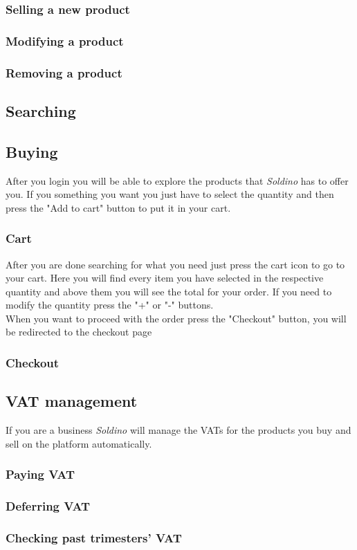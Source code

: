 	\subsubsection{Selling a new product}
	
	\subsubsection{Modifying a product}
	
	\subsubsection{Removing a product}
	
	\subsection{Searching}
	\subsection{Buying}
	After you login you will be able to explore the products that 
	\textit{Soldino} has to offer you. If you something you want you
	just have to select the quantity and then press the "Add to cart" button 
	to put it in your cart.
	\subsubsection{Cart}
	After you are done searching for what you need just press the cart icon to
	go to your cart. Here you will find every item you have selected in the 
	respective quantity and above them you will see the total for your order.
	If you need to modify the quantity press the "+" or "-" buttons. \\
	When you want to proceed with the order press the "Checkout" button, 
	you will be redirected to the checkout page
	\subsubsection{Checkout}
	\subsection{VAT management}
	If you are a business \textit{Soldino} will manage the VATs for the products 
	you buy and sell on the platform automatically.
		\subsubsection{Paying VAT}
	
		\subsubsection{Deferring VAT}
		
		\subsubsection{Checking past trimesters' VAT}
		